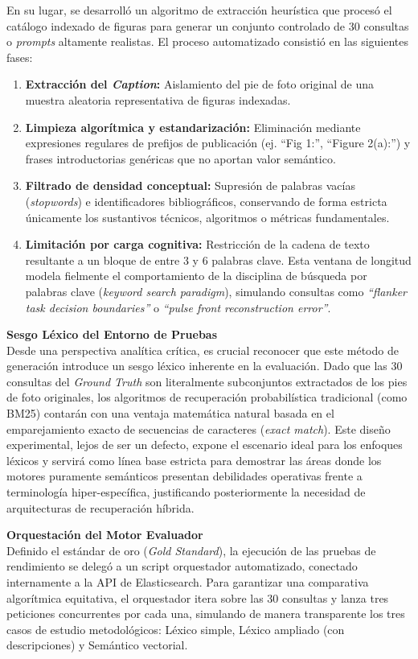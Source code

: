 \documentclass[a4paper]{report}
\begin{document}
En su lugar, se desarrolló un algoritmo de extracción heurística que procesó el catálogo indexado de figuras para generar un conjunto controlado de 30 consultas o \textit{prompts} altamente realistas. El proceso automatizado consistió en las siguientes fases:
\begin{enumerate}
    \item \textbf{Extracción del \textit{Caption}:} Aislamiento del pie de foto original de una muestra aleatoria representativa de figuras indexadas.
    \item \textbf{Limpieza algorítmica y estandarización:} Eliminación mediante expresiones regulares de prefijos de publicación (ej. ``Fig 1:'', ``Figure 2(a):'') y frases introductorias genéricas que no aportan valor semántico.
    \item \textbf{Filtrado de densidad conceptual:} Supresión de palabras vacías (\textit{stopwords}) e identificadores bibliográficos, conservando de forma estricta únicamente los sustantivos técnicos, algoritmos o métricas fundamentales.
    \item \textbf{Limitación por carga cognitiva:} Restricción de la cadena de texto resultante a un bloque de entre 3 y 6 palabras clave. Esta ventana de longitud modela fielmente el comportamiento de la disciplina de búsqueda por palabras clave (\textit{keyword search paradigm}), simulando consultas como \textit{``flanker task decision boundaries''} o \textit{``pulse front reconstruction error''}.
\end{enumerate}

\textbf{Sesgo Léxico del Entorno de Pruebas}\\
Desde una perspectiva analítica crítica, es crucial reconocer que este método de generación introduce un sesgo léxico inherente en la evaluación. Dado que las 30 consultas del \textit{Ground Truth} son literalmente subconjuntos extractados de los pies de foto originales, los algoritmos de recuperación probabilística tradicional (como BM25) contarán con una ventaja matemática natural basada en el emparejamiento exacto de secuencias de caracteres (\textit{exact match}). Este diseño experimental, lejos de ser un defecto, expone el escenario ideal para los enfoques léxicos y servirá como línea base estricta para demostrar las áreas donde los motores puramente semánticos presentan debilidades operativas frente a terminología hiper-específica, justificando posteriormente la necesidad de arquitecturas de recuperación híbrida.

\textbf{Orquestación del Motor Evaluador}\\
Definido el estándar de oro (\textit{Gold Standard}), la ejecución de las pruebas de rendimiento se delegó a un script orquestador automatizado, conectado internamente a la API de Elasticsearch. Para garantizar una comparativa algorítmica equitativa, el orquestador itera sobre las 30 consultas y lanza tres peticiones concurrentes por cada una, simulando de manera transparente los tres casos de estudio metodológicos: Léxico simple, Léxico ampliado (con descripciones) y Semántico vectorial.
\end{document}
